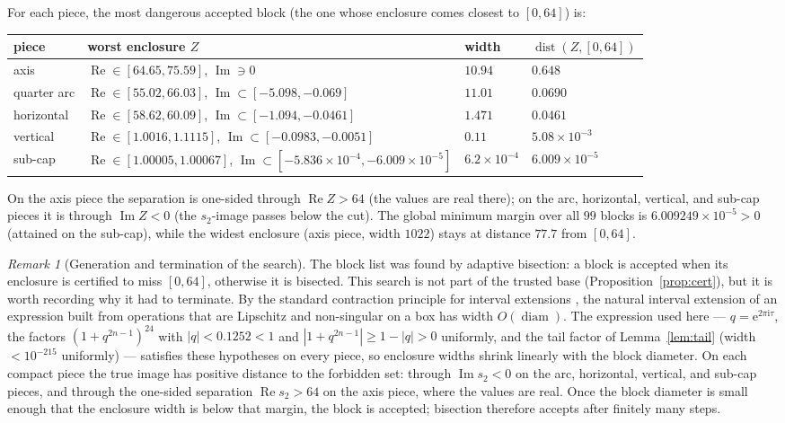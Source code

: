 \documentclass[11pt]{article}
\theoremstyle{definition}
\theoremstyle{remark}
\newtheorem{remark}[theorem]{Remark}
\newcommand{\ii}{\mathrm{i}}
\newcommand{\e}{\mathrm{e}}
\newcommand{\ImT}{\operatorname{Im}}
\newcommand{\ReT}{\operatorname{Re}}
\begin{document}
For each piece, the most dangerous accepted block (the one whose enclosure
comes closest to $[0,64]$) is:
\begin{center}\footnotesize
\begin{tabular}{llll}
\toprule
piece & worst enclosure $Z$ & width & $\operatorname{dist}(Z,[0,64])$ \\
\midrule
axis       & $\ReT\in[64.65,75.59]$, $\ImT\ni0$ & $10.94$ & $0.648$ \\
quarter arc & $\ReT\in[55.02,66.03]$, $\ImT\subset[-5.098,-0.069]$ &
  $11.01$ & $0.0690$ \\
horizontal & $\ReT\in[58.62,60.09]$, $\ImT\subset[-1.094,-0.0461]$ &
  $1.471$ & $0.0461$ \\
vertical   & $\ReT\in[1.0016,1.1115]$, $\ImT\subset[-0.0983,-0.0051]$ &
  $0.11$ & $5.08\times10^{-3}$ \\
sub-cap    & $\ReT\in[1.00005,1.00067]$,
  $\ImT\subset[-5.836\times10^{-4},-6.009\times10^{-5}]$ &
  $6.2\times10^{-4}$ & $6.009\times10^{-5}$ \\
\bottomrule
\end{tabular}
\end{center}
On the axis piece the separation is one-sided through $\ReT Z>64$ (the
values are real there); on the arc, horizontal, vertical, and sub-cap
pieces it is through $\ImT Z<0$ (the $s_2$-image passes below the cut).
The global minimum margin over all $99$ blocks is
$6.009249\times10^{-5}>0$ (attained on the sub-cap), while the widest
enclosure (axis piece, width $1022$) stays at distance $77.7$ from
$[0,64]$.

\begin{remark}[Generation and termination of the search]\label{rem:termin}
The block list was found by adaptive bisection: a block is accepted when
its enclosure is certified to miss $[0,64]$, otherwise it is bisected.
This search is not part of the trusted base
(Proposition~\ref{prop:cert}), but it is worth recording why it had to
terminate. By the standard contraction principle for interval extensions
\cite{MoKC}, the natural interval extension of an expression built from
operations that are Lipschitz and non-singular on a box has width
$O(\operatorname{diam})$. The expression used here ---
$q=\e^{2\pi \ii\tau}$, the factors $(1+q^{2n-1})^{24}$ with
$|q|<0.1252<1$ and $|1+q^{2n-1}|\ge1-|q|>0$ uniformly, and the
tail factor of Lemma~\ref{lem:tail} (width $<10^{-215}$ uniformly) ---
satisfies these hypotheses on every piece, so enclosure widths shrink
linearly with the block diameter. On each compact piece the true image
has positive distance to the forbidden set: through $\ImT s_2<0$ on the
arc, horizontal, vertical, and sub-cap pieces, and through the one-sided
separation $\ReT s_2>64$ on the axis piece, where the values are real.
Once the block diameter is small enough that the enclosure width is below
that margin, the block is accepted; bisection therefore accepts after
finitely many steps.
\end{remark}
\end{document}

